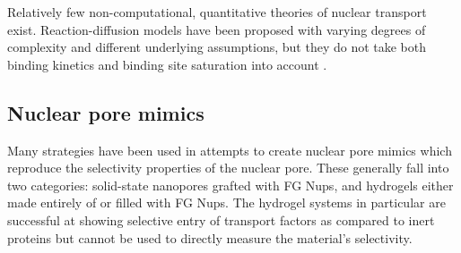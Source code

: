 
Relatively few non-computational, quantitative theories of nuclear transport exist.  Reaction-diffusion models have been proposed with varying degrees of complexity and different underlying assumptions, but they do not take both binding kinetics and binding site saturation into account \cite{yang18,zilman07}.




\subsection{Nuclear pore mimics}

Many strategies have been used in attempts to create nuclear pore mimics which reproduce the selectivity properties of the nuclear pore.  These generally fall into two categories: solid-state nanopores grafted with FG Nups, and hydrogels either made entirely of or filled with FG Nups.  The hydrogel systems in particular are successful at showing selective entry of transport factors as compared to inert proteins but cannot be used to directly measure the material's selectivity.

